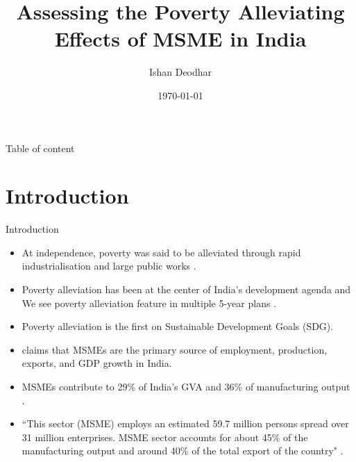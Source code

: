 \documentclass[10pt,aspectratio=169]{beamer}
\title{Assessing the Poverty Alleviating Effects of MSME
in India}
\author{Ishan Deodhar}
\institute{\normalsize {Under the guidance of \\ Mr. Balu Pawde, \\ Gokhale Institute of Politics and Economics}\vspace{0.8cm}}
\date{\today}
\begin{document}
\begin{frame}
  \titlepage
\end{frame}

\begin{frame}{Table of content}
    \tableofcontents 
\end{frame}

\section{Introduction}
\begin{frame}{Introduction}

{\fontsize{10pt}{12pt}\selectfont
    \begin{itemize}
        \item At independence, poverty was said to be alleviated through rapid industrialisation and large public works \parencite[ch. 1]{balakrishnan_indias_economy}.
        \item Poverty alleviation has been at the center of India's development agenda and We see poverty alleviation feature in multiple 5-year plans \parencite{kapila_indian_economy}.
        \item Poverty alleviation is the first on Sustainable Development Goals (SDG).
    \end{itemize}

\vspace{0.5cm}

    \begin{itemize}
        \item \textcite{amutha2022role} claims that MSMEs are the primary
        source of employment, production, exports, and GDP growth in India.
        \item MSMEs contribute to 29\% of India's GVA and 36\% of manufacturing output \parencite{MSME2023}.
        \item ``This sector (MSME) employs an estimated 59.7 million persons spread over 31 million enterprises. MSME sector accounts for about 45\% of the manufacturing output and around 40\% of the total export of the country" \parencite[739]{purakala2020role}.
        
        
    \end{itemize}
}
\end{frame}
\end{document}
